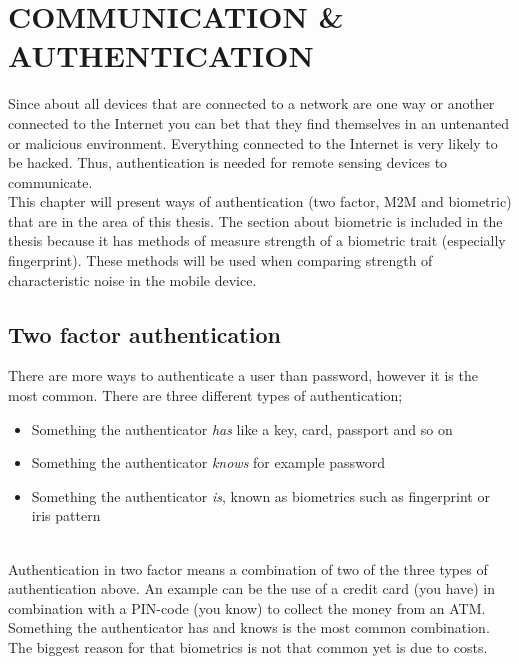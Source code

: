 \chapter{COMMUNICATION \& AUTHENTICATION}\label{cha:auth} 
Since about all devices that are connected to a network are one way or another connected to the Internet you can bet that they find themselves in an untenanted or malicious environment. Everything connected to the Internet is very likely to be hacked. Thus, authentication is needed for remote sensing devices to communicate. \cite[]{auth:M2Mcom}\\
This chapter will present ways of authentication (two factor, M2M and biometric) that are in the area of this thesis. The section about biometric is included in the thesis because it has methods of measure strength of a biometric trait (especially fingerprint). These methods will be used when comparing strength of characteristic noise in the mobile device. \\


\section{Two factor authentication}\label{sec:2fauth} 
There are more ways to authenticate a user than password, however it is the most common. There are three different types of authentication; 
\begin{itemize}
	\item Something the authenticator \textit{has} like a key, card, passport and so on
	\item Something the authenticator \textit{knows} for example password
	\item Something the authenticator \textit{is}, known as biometrics such as fingerprint or iris pattern
\end{itemize}
\cite[p.~31]{rosssec} \\
Authentication in two factor means a combination of two of the three types of authentication above. An example can be the use of a credit card (you have) in combination with a PIN-code (you know) to collect the money from an ATM. Something the authenticator has and knows is the most common combination. The biggest reason for that biometrics is not that common yet is due to costs.
\cite[p.~47]{rosssec}


